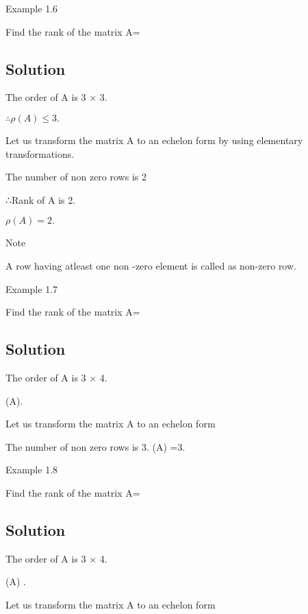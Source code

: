 \documentclass[12pt, a4paper]{article}
\begin{document}

Example 1.6

Find the rank of the matrix A= 

\bigskip \subsection*{Solution}

The order of A is 3 × 3.

$\therefore \rho(A) \leq 3.$

Let us transform the matrix A to an echelon form by using elementary transformations.



The number of non zero rows is 2

∴Rank of A is 2.

$\rho (A) = 2.$

Note

A row having atleast one non -zero element is called as non-zero row.

 
\newpage
Example 1.7

Find the rank of the matrix A= 

\bigskip \subsection*{Solution}

The order of A is 3 × 4.

\therefore \rho (A).

Let us transform the matrix A to an echelon form



The number of non zero rows is 3. \therefore \rho(A) =3.

 

Example 1.8

Find the rank of the matrix A= 

\bigskip \subsection*{Solution}

The order of A is 3 × 4.

\therefore \rho(A) .

Let us transform the matrix A to an echelon form
\end{document}
